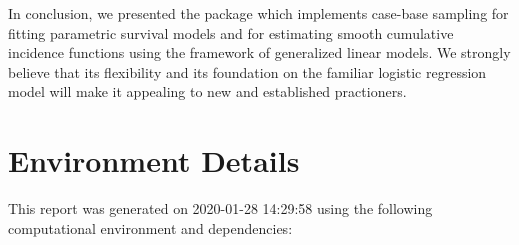 \documentclass[
]{jss}
\begin{document}
In conclusion, we presented the  package 
which implements case-base sampling for fitting parametric survival
models and for estimating smooth cumulative incidence functions using
the framework of generalized linear models. We strongly believe that its
flexibility and its foundation on the familiar logistic regression model
will make it appealing to new and established practioners.

\hypertarget{environment-details}{%
\section{Environment Details}\label{environment-details}}

This report was generated on 2020-01-28 14:29:58 using the following
computational environment and dependencies:
\end{document}
